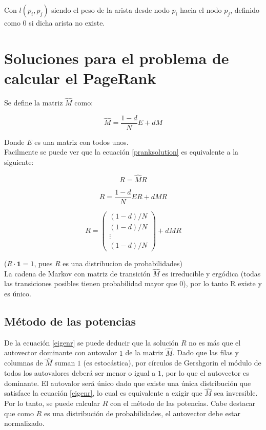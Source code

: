 \documentclass[%
    final,
    notitlepage,
    narroweqnarray,
    inline,
    twoside,
    invited
    ]{ieee}
\begin{document}
Con $l(p_{i},p_{j})$ siendo el peso de la arista desde nodo $p_{i}$ hacia el nodo $p_{j}$, definido como $0$ si dicha arista no existe.\\

\section{Soluciones para el problema de calcular el PageRank}

Se define la matriz $\widehat{M}$ como:

\begin{equation}\label{mhat}
\widehat{M} = \frac{1-d}{N}E + dM
\end{equation}

Donde $E$ es una matriz con todos unos.\\

Facilmente se puede ver que la ecuación \eqref{pranksolution} es equivalente a la siguiente:

\begin{equation}\label{eigenr}
R = \widehat{M}R
\end{equation}

\[
    R = \frac{1-d}{N}ER + dMR
\]

\[
    R = \begin{pmatrix}
            (1-d)/N \\ (1-d)/N \\ \vdots \\ (1-d)/N
        \end{pmatrix} + dMR
\]

($R \cdot \mathbf 1 = 1$, pues $R$ es una distribucion de probabilidades)\\

La cadena de Markov con matriz de transición $\widehat{M}$ es irreducible y ergódica (todas las transiciones posibles tienen probabilidad mayor
que $0$), por lo tanto R existe y es único.

\subsection{Método de las potencias}

De la ecuación \eqref{eigenr} se puede deducir que la solución $R$ no es más que el autovector dominante con autovalor $1$ de la matriz $\widehat{M}$.
Dado que las filas y columnas de
$\widehat{M}$ suman $1$ (es estocástica), por círculos de Gershgorin el módulo de todos los autovalores deberá ser menor o igual a $1$, por lo que el autovector
es dominante. El autovalor será único dado que existe una única distribución que satisface la ecuación \eqref{eigenr}, lo cual es equivalente a exigir
que $\widehat{M}$ sea inversible.
Por lo tanto, se puede calcular $R$ con el método de las potencias. Cabe destacar que como
$R$ es una distribución de probabilidades, el autovector debe estar normalizado.\\
\end{document}
